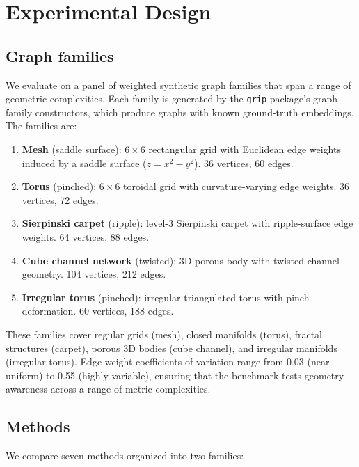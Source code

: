 \documentclass[11pt,twocolumn]{article}
\newcommand{\grip}{\texttt{grip}}
\begin{document}
\section{Experimental Design}\label{sec:experiments}

\subsection{Graph families}

We evaluate on a panel of weighted synthetic graph families that span a
range of geometric complexities.  Each family is generated by the
\grip{} package's graph-family constructors, which produce graphs with
known ground-truth embeddings.  The families are:

\begin{enumerate}
\item \textbf{Mesh} (saddle surface): $6 \times 6$ rectangular grid with
  Euclidean edge weights induced by a saddle surface
  ($z = x^2 - y^2$).  36 vertices, 60 edges.
\item \textbf{Torus} (pinched): $6 \times 6$ toroidal grid with
  curvature-varying edge weights.  36 vertices, 72 edges.
\item \textbf{Sierpinski carpet} (ripple): level-3 Sierpinski carpet
  with ripple-surface edge weights.  64 vertices, 88 edges.
\item \textbf{Cube channel network} (twisted): 3D porous body with
  twisted channel geometry.  104 vertices, 212 edges.
\item \textbf{Irregular torus} (pinched): irregular triangulated torus
  with pinch deformation.  60 vertices, 188 edges.
\end{enumerate}

These families cover regular grids (mesh), closed manifolds (torus),
fractal structures (carpet), porous 3D bodies (cube channel), and
irregular manifolds (irregular torus).  Edge-weight coefficients of
variation range from 0.03 (near-uniform) to 0.55 (highly variable),
ensuring that the benchmark tests geometry awareness across a range of
metric complexities.

\subsection{Methods}

We compare seven methods organized into two families:
\end{document}
